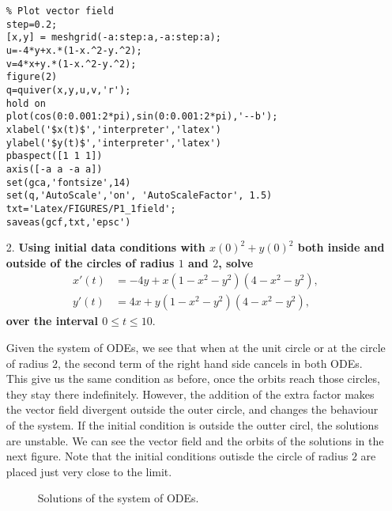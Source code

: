 \begin{enumerate}
\begin{verbatim}
% Plot vector field
step=0.2;
[x,y] = meshgrid(-a:step:a,-a:step:a);
u=-4*y+x.*(1-x.^2-y.^2);
v=4*x+y.*(1-x.^2-y.^2);
figure(2)
q=quiver(x,y,u,v,'r');
hold on
plot(cos(0:0.001:2*pi),sin(0:0.001:2*pi),'--b');
xlabel('$x(t)$','interpreter','latex')
ylabel('$y(t)$','interpreter','latex')
pbaspect([1 1 1])
axis([-a a -a a])
set(gca,'fontsize',14)
set(q,'AutoScale','on', 'AutoScaleFactor', 1.5)
txt='Latex/FIGURES/P1_1field';
saveas(gcf,txt,'epsc')
\end{verbatim}
\item[2.] \textbf{Using initial data conditions with $x(0)^2+y(0)^2$ both inside and outside of the circles of radius $1$ and $2$, solve}
\begin{align*}
x'(t)&=-4y+x(1-x^2-y^2)(4-x^2-y^2),\\
y'(t)&=4x+y(1-x^2-y^2)(4-x^2-y^2),
\end{align*}
\textbf{over the interval $0\leq t\leq 10$}.

Given the system of ODEs, we see that when at the unit circle or at the circle of radius $2$, the second term of the right hand side cancels in both ODEs. This give us the same condition as before, once the orbits reach those circles, they stay there indefinitely. However, the addition of the extra factor makes the vector field divergent outside the outer circle, and changes the behaviour of the system. If the initial condition is outside the outter circl, the solutions are unstable. We can see the vector field and the orbits of the solutions in the next figure. Note that the initial conditions outisde the circle of radius $2$ are placed just very close to the limit.
\begin{figure}[H]
\centering     %
\hspace*{\fill}
\hspace*{\fill}
\hspace*{\fill}
\caption{Solutions of the system of ODEs.}
\end{figure}
\end{enumerate}
